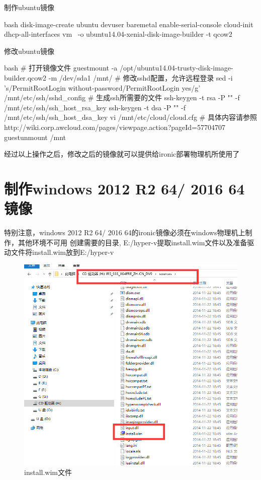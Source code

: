 制作ubuntu镜像
\begin{code-block}{bash}
disk-image-create ubuntu devuser baremetal enable-serial-console cloud-init dhcp-all-interfaces vm \
        -o ubuntu14.04-xenial-disk-image-builder -t qcow2
\end{code-block}

修改ubuntu镜像
\begin{code-block}{bash}
# 打开镜像文件
guestmount -a /opt/ubuntu14.04-trusty-disk-image-builder.qcow2 -m /dev/sda1 /mnt/
# 修改sshd配置，允许远程登录
sed -i 's/PermitRootLogin without-password/PermitRootLogin yes/g' /mnt/etc/ssh/sshd_config
# 生成ssh所需要的文件
ssh-keygen  -t rsa -P "" -f  /mnt/etc/ssh/ssh_host_rsa_key
ssh-keygen  -t dsa -P "" -f  /mnt/etc/ssh/ssh_host_dsa_key
vi /mnt/etc/cloud/cloud.cfg
# 具体内容请参照 http://wiki.corp.awcloud.com/pages/viewpage.action?pageId=57704707
guestunmount /mnt
\end{code-block}

经过以上操作之后，修改之后的镜像就可以提供给ironic部署物理机所使用了

\section{制作windows 2012 R2 64/ 2016 64镜像}
特别注意，windows 2012 R2 64/ 2016 64的ironic镜像必须在windows物理机上制作，其他环境不可用
创建需要的目录, E:/hyper-v提取install.wim文件以及准备驱动文件将install.wim放到E:/hyper-v
\begin{figure}[H]
  \centering
  \includegraphics[scale=0.3]{installwim.png}
  \caption{install.wim文件}
  \label{fig:installwim}
\end{figure}

